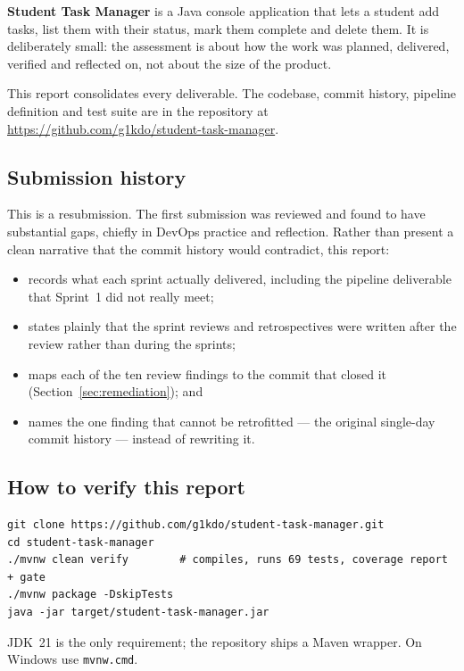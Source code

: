 \documentclass[11pt,a4paper]{article}
\newcommand{\code}[1]{\texttt{\small #1}}
\begin{document}
\textbf{Student Task Manager} is a Java console application that lets a student
add tasks, list them with their status, mark them complete and delete them. It
is deliberately small: the assessment is about how the work was planned,
delivered, verified and reflected on, not about the size of the product.

This report consolidates every deliverable. The codebase, commit history,
pipeline definition and test suite are in the repository at
\url{https://github.com/g1kdo/student-task-manager}.

\subsection{Submission history}

This is a resubmission. The first submission was reviewed and found to have
substantial gaps, chiefly in DevOps practice and reflection. Rather than present
a clean narrative that the commit history would contradict, this report:

\begin{itemize}
  \item records what each sprint actually delivered, including the pipeline
        deliverable that Sprint~1 did not really meet;
  \item states plainly that the sprint reviews and retrospectives were written
        after the review rather than during the sprints;
  \item maps each of the ten review findings to the commit that closed it
        (Section~\ref{sec:remediation}); and
  \item names the one finding that cannot be retrofitted --- the original
        single-day commit history --- instead of rewriting it.
\end{itemize}

\subsection{How to verify this report}

\begin{lstlisting}[style=plain]
git clone https://github.com/g1kdo/student-task-manager.git
cd student-task-manager
./mvnw clean verify        # compiles, runs 69 tests, coverage report + gate
./mvnw package -DskipTests
java -jar target/student-task-manager.jar
\end{lstlisting}

\noindent JDK~21 is the only requirement; the repository ships a Maven wrapper.
On Windows use \code{mvnw.cmd}.
\end{document}
